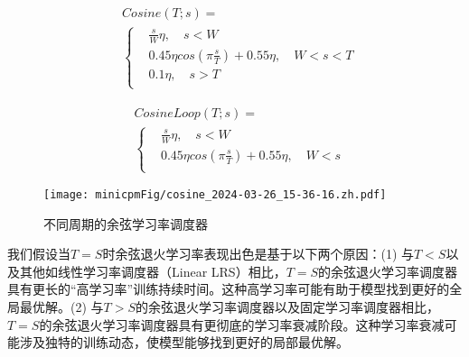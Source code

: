 \begin{figure}[htbp]
    \centering
    \begin{minipage}{0.47\linewidth}
        \begin{equation*}
    \begin{aligned}
    & Cosine(T; s) = \\
    & \begin{cases}
       & \frac{s}{W} \eta, \quad s<W \\
       & 0.45\eta cos(\pi \frac{s}{T}) + 0.55\eta, \quad W < s < T \\
       & 0.1\eta,\quad  s > T \\
    \end{cases}
\end{aligned}
        \end{equation*}
    \end{minipage}
    \hfill %
    \begin{minipage}{0.52\linewidth}
             \begin{equation*}
    \begin{aligned}
    & CosineLoop(T; s) = \\
    & \begin{cases}
       & \frac{s}{W} \eta, \quad s<W \\
       & 0.45\eta cos(\pi \frac{s}{T}) + 0.55\eta, \quad W < s  \\
    \end{cases}
\end{aligned}
        \end{equation*}
    \end{minipage}
\end{figure}

\begin{figure}
    \centering
    \texttt{[image: minicpmFig/cosine\_2024-03-26\_15-36-16.zh.pdf]}
    \caption{不同周期的余弦学习率调度器}
    \label{fig:cosine_lr}
    \vspace{0.47cm}
\end{figure}

我们假设当$T = S$时余弦退火学习率表现出色是基于以下两个原因：(1) 与$T < S$以及其他如线性学习率调度器（Linear LRS）相比，$T = S$的余弦退火学习率调度器具有更长的“高学习率”训练持续时间。这种高学习率可能有助于模型找到更好的全局最优解。(2) 与$T > S$的余弦退火学习率调度器以及固定学习率调度器相比，$T = S$的余弦退火学习率调度器具有更彻底的学习率衰减阶段。这种学习率衰减可能涉及独特的训练动态，使模型能够找到更好的局部最优解。

